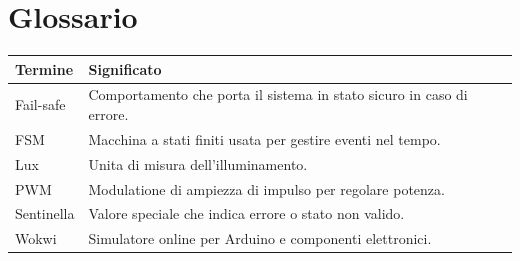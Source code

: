 \chapter{Glossario}

\begin{longtable}{@{}p{3.5cm}p{11cm}@{}}
\toprule
Termine & Significato \\
\midrule
Fail-safe & Comportamento che porta il sistema in stato sicuro in caso di errore. \\
FSM & Macchina a stati finiti usata per gestire eventi nel tempo. \\
Lux & Unita di misura dell'illuminamento. \\
PWM & Modulatione di ampiezza di impulso per regolare potenza. \\
Sentinella & Valore speciale che indica errore o stato non valido. \\
Wokwi & Simulatore online per Arduino e componenti elettronici. \\
\bottomrule
\end{longtable}
